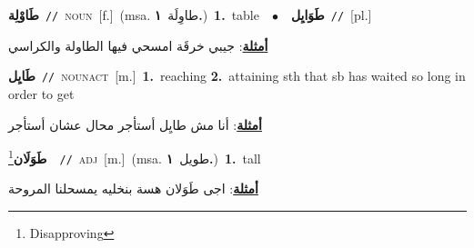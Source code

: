 \documentclass[10pt,a4paper,twoside]{article} %
\begin{document}
\begin{multicols}{2}
{\setlength\topsep{0pt}\textbf{\foreignlanguage{arabic}{طَاوْلِة}}\ {\color{gray}\texttt{//}\color{black}}\ \textsc{noun}\ [f.]\ \color{gray}(msa. \foreignlanguage{arabic}{طاوِلَة}~\foreignlanguage{arabic}{\textbf{١.}})\color{black}\ \textbf{1.}~table\ \ $\bullet$\ \ \setlength\topsep{0pt}\textbf{\foreignlanguage{arabic}{طَوَايِل}}\ {\color{gray}\texttt{//}\color{black}}\ [pl.]\  \begin{flushright}\color{gray}\foreignlanguage{arabic}{\textbf{\underline{\foreignlanguage{arabic}{أمثلة}}}: جيبي خرقَة امسحي فيها الطاولة والكراسي}\end{flushright}\color{black}} \vspace{2mm}

{\setlength\topsep{0pt}\textbf{\foreignlanguage{arabic}{طَايِل}}\ {\color{gray}\texttt{//}\color{black}}\ \textsc{noun\textunderscore act}\ [m.]\ \textbf{1.}~reaching  \textbf{2.}~attaining sth that sb has waited so long in order to get\  \begin{flushright}\color{gray}\foreignlanguage{arabic}{\textbf{\underline{\foreignlanguage{arabic}{أمثلة}}}: أنا مش طايِل أستأجر محال عشان أستأجر}\end{flushright}\color{black}} \vspace{2mm}

{\setlength\topsep{0pt}\textbf{\foreignlanguage{arabic}{طَوَلَان}}\footnote{Disapproving}\ \ {\color{gray}\texttt{//}\color{black}}\ \textsc{adj}\ [m.]\ \color{gray}(msa. \foreignlanguage{arabic}{طويل}~\foreignlanguage{arabic}{\textbf{١.}})\color{black}\ \textbf{1.}~tall\  \begin{flushright}\color{gray}\foreignlanguage{arabic}{\textbf{\underline{\foreignlanguage{arabic}{أمثلة}}}: اجى طَوَلان هسة بنخليه يمسحلنا المروحة}\end{flushright}\color{black}} \vspace{2mm}


\end{multicols}
\end{document}
